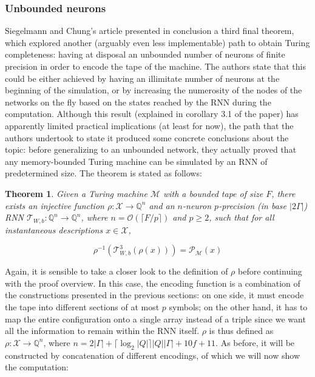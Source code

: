 \documentclass{article}
\newtheorem{theorem}{Theorem}
\begin{document}
\subsubsection{Unbounded neurons}
Siegelmann and Chung's article presented in conclusion a third final theorem, which explored another (arguably even less implementable) path to obtain Turing completeness: having at disposal an unbounded number of neurons of finite precision in order to encode the tape of the machine. The authors state that this could be either achieved by having an illimitate number of neurons at the beginning of the simulation, or by increasing the numerosity of the nodes of the networks on the fly based on the states reached by the RNN during the computation. Although this result (explained in corollary 3.1 of the paper) has apparently limited practical implications (at least for now), the path that the authors undertook to state it produced some concrete conclusions about the topic: before generalizing to an unbounded network, they actually proved that any memory-bounded Turing machine can be simulated by an RNN of predetermined size. The theorem is stated as follows:

\begin{theorem}\label{th:theorem3}
    Given a Turing machine $\mathcal{M}$ with a bounded tape of size $F$, there exists an injective function $\rho:\mathcal{X} \rightarrow \mathbb{Q}^n$ and an $n$-neuron $p$-precision (in base $|2\Gamma|$) RNN $\mathcal{T}_{W,b}:\mathbb{Q}^n \to \mathbb{Q}^n$, where $n=\mathcal{O}(\lceil F/p \rceil)$ and $p \geq 2$, such that for all instantaneous descriptions $x \in \mathcal{X}$,

    $$\rho^{-1}(\mathcal{T}^3_{W,b}(\rho(x))) = \mathcal{P}_{\mathcal{M}}(x)$$
\end{theorem}

Again, it is sensible to take a closer look to the definition of $\rho$ before continuing with the proof overview. In this case, the encoding function is a combination of the constructions presented in the previous sections: on one side, it must encode the tape into different sections of at most $p$ symbols; on the other hand, it has to map the entire configuration onto a single array instead of a triple since we want all the information to remain within the RNN itself. $\rho$ is thus defined as $\rho:\mathcal{X} \to \mathbb{Q}^n$, where $n = 2|\Gamma|+\lceil \log_2|Q|\rceil |Q||\Gamma| + 10f + 11$. As before, it will be constructed by concatenation of different encodings, of which we will now show the computation:
\end{document}
